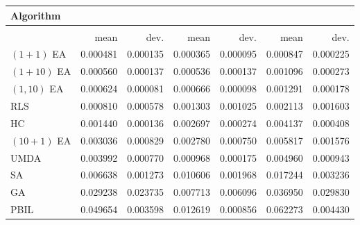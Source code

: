 \begin{tabular}{@{} l *{6}{>{{}}N{1}{2}} @{}}
\toprule
{Algorithm} &  \\
\midrule
&  &  &  \\
\midrule
& {mean} & {dev.} & {mean} & {dev.} & {mean} & {dev.} \\
\midrule
$(1+1)$ EA & 0.000481 & 0.000135 & 0.000365 & 0.000095 & 0.000847 & 0.000225 \\
$(1+10)$ EA & 0.000560 & 0.000137 & 0.000536 & 0.000137 & 0.001096 & 0.000273 \\
$(1,10)$ EA & 0.000624 & 0.000081 & 0.000666 & 0.000098 & 0.001291 & 0.000178 \\
RLS & 0.000810 & 0.000578 & 0.001303 & 0.001025 & 0.002113 & 0.001603 \\
HC & 0.001440 & 0.000136 & 0.002697 & 0.000274 & 0.004137 & 0.000408 \\
$(10+1)$ EA & 0.003036 & 0.000829 & 0.002780 & 0.000750 & 0.005817 & 0.001576 \\
UMDA & 0.003992 & 0.000770 & 0.000968 & 0.000175 & 0.004960 & 0.000943 \\
SA & 0.006638 & 0.001273 & 0.010606 & 0.001968 & 0.017244 & 0.003236 \\
GA & 0.029238 & 0.023735 & 0.007713 & 0.006096 & 0.036950 & 0.029830 \\
PBIL & 0.049654 & 0.003598 & 0.012619 & 0.000856 & 0.062273 & 0.004430 \\
\bottomrule
\end{tabular}
